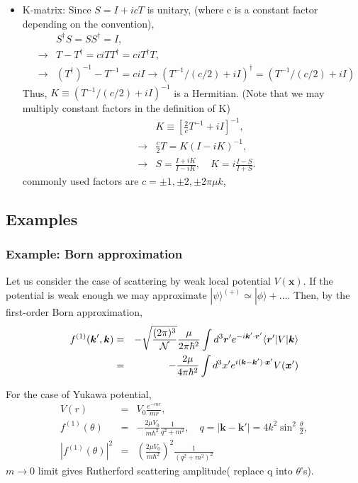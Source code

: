 \documentclass[10pt]{book}
\def\bm{\boldsymbol}
\newcommand{\bea}{\begin{eqnarray}}
\newcommand{\eea}{\end{eqnarray}}
\newcommand{\no}{\nonumber \\}
\def\vk{{\bm k}}
\def\vx{{\bm x}}
\def\vr{{\bm r}}
\def\la{\langle}
\def\ra{\rangle}
\begin{document}
\begin{itemize}
\item K-matrix: Since $S=I+ic T$ is unitary, (where c is a constant factor
depending on the convention),
\bea
& &S^\dagger S=S S^\dagger =I,\no 
&\to & T-T^\dagger= c i T T^\dagger=c i T^\dagger T, \no
&\to& (T^\dagger)^{-1}-T^{-1}=c i I \to (T^{-1}/(c/2)+iI)^\dagger=(T^{-1}/(c/2)+iI)   
\eea 
Thus, $K\equiv (T^{-1}/(c/2)+iI)^{-1}$ is a Hermitian. 
(Note that we may multiply constant factors in the definition of K)
\bea 
& &K\equiv \left[ \frac{2}{c}T^{-1}+iI\right]^{-1},\no 
&\to &\frac{c}{2}T=K(I-iK)^{-1}, \no 
&\to &S=\frac{I+iK}{I-iK}, \quad K=i\frac{I-S}{I+S}.
\eea 
commonly used factors are $c=\pm 1, \pm 2,\pm 2\pi\mu k$, 



\end{itemize}

\subsection{Examples}
\subsubsection{Example: Born approximation}
Let us consider the case of scattering by weak local potential $V(\vx)$.
If the potential is weak enough we may approximate $|\psi\ra^{(+)}\simeq |\phi\ra +\dots$.
Then, by the first-order Born approximation,
\bea
f^{(1)}(\vk',\vk)&=&-\sqrt{\frac{(2\pi)^3}{\cal N}}\frac{\mu}{2\pi\hbar^2} 
                    \int d^3\vr' e^{-i\vk'\cdot\vr'}
                    \la \vr'|V|\vk\ra \no 
                 &=& -\frac{2\mu}{4\pi \hbar^2}\int d^3 x' e^{i(\vk-\vk')\cdot\vx'} V(\vx')  
\eea

For the case of Yukawa potential,
\bea
V(r)&=&V_0\frac{e^{-m r}}{m r},\no 
f^{(1)}(\theta)&=& -\frac{2\mu V_0}{m\hbar^2 }\frac{1}{q^2+m^2},\quad
  q=|\vk-\vk'|=4k^2 \sin^2\frac{\theta}{2},\no   
|f^{(1)}(\theta)|^2&=& \left(\frac{2\mu V_0}{m\hbar^2 }\right)^2 \frac{1}{(q^2+m^2)^2}
\eea 
$m\to 0$ limit gives Rutherford scattering amplitude( replace q into $\theta$'s).
\end{document}
